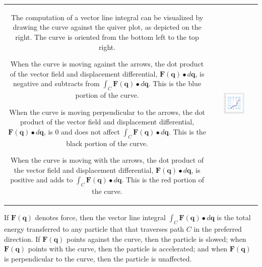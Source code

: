 \documentclass{article}
\begin{document}
\begin{tabular}{cc}
\parbox{0.5\textwidth}{
The computation of a vector line integral can be visualized by drawing the curve against the quiver plot, as depicted on the right. The curve is oriented from the bottom left to the top right. 

When the curve is moving against the arrows, the dot product of the vector field and displacement differential, \(\mathbf{F}(\mathbf{q}) \bullet d\mathbf{q}\), is negative and subtracts from \(\int_C \mathbf{F}(\mathbf{q}) \bullet d\mathbf{q}\). This is the blue portion of the curve.

When the curve is moving perpendicular to the arrows, the dot product of the vector field and displacement differential, \(\mathbf{F}(\mathbf{q}) \bullet d\mathbf{q}\), is \(0\) and does not affect \(\int_C \mathbf{F}(\mathbf{q}) \bullet d\mathbf{q}\). This is the black portion of the curve. 

When the curve is moving with the arrows, the dot product of the vector field and displacement differential, \(\mathbf{F}(\mathbf{q}) \bullet d\mathbf{q}\), is positive and adds to \(\int_C \mathbf{F}(\mathbf{q}) \bullet d\mathbf{q}\). This is the red portion of the curve. 
} & \parbox{0.5\textwidth}{
\includegraphics[width = 0.5\textwidth]{example_vector_line_integral_1.png}
}
\end{tabular}

\vspace{5mm}

If \(\mathbf{F}(\mathbf{q})\) denotes force, then the vector line integral \(\int_C \mathbf{F}(\mathbf{q}) \bullet d\mathbf{q}\) is the total energy transferred to any particle that that traverses path \(C\) in the preferred direction. If \(\mathbf{F}(\mathbf{q})\) points against the curve, then the particle is slowed; when \(\mathbf{F}(\mathbf{q})\) points with the curve, then the particle is accelerated; and when \(\mathbf{F}(\mathbf{q})\) is perpendicular to the curve, then the particle is unaffected.
\end{document}
